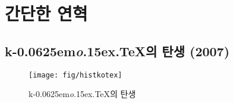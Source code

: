 \documentclass[a4paper,%
	10.5pt,%
	amsmath,%
	chapter,%
	twoside,%
	openany,%
	finemath,%
	oldfontcommands]%
{oblivoir}
\newcommand*\kotex{\texorpdfstring{\textsf{k}\kern-0.0625em\textit{o}\kern-1.5pt\lower.15ex\hbox{.}\kern-1pt\protect\TeX}{ko.TeX}}
\def\util#1{\texttt{#1}\index{Utilities!#1}\index{#1}}
\def\pkg#1{\textsf{#1}\index{Packages!#1}}
\def\wi#1{#1\index{#1}}
\begin{document}



\section{간단한 연혁}

\subsection{\protect\kotex 의 탄생 (2007)}

\begin{figure}[t]
\centering
\texttt{[image: fig/histkotex]}
\caption{\protect\kotex 의 탄생}\label{fig:hist}
\end{figure}
\end{document}
